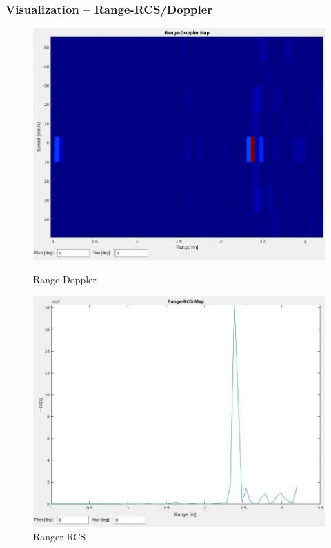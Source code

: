 \documentclass[aspectratio=43]{beamer}
\begin{document}
\begin{frame}[fragile]
	\frametitle{Visualization -- Range-RCS/Doppler}
	\begin{figure}[!htb]
		\begin{minipage}{0.48\textwidth}
			\centering
      \includegraphics[width=\textwidth]{../img/vis_range_dop.jpg}
			\caption{Range-Doppler}
		\end{minipage}\hfill
		\begin{minipage}{0.48\textwidth}
			\centering
      \includegraphics[width=\textwidth]{../img/vis_range_rcs.jpg}
			\caption{Ranger-RCS}
		\end{minipage}
	\end{figure}
\end{frame}
\end{document}

